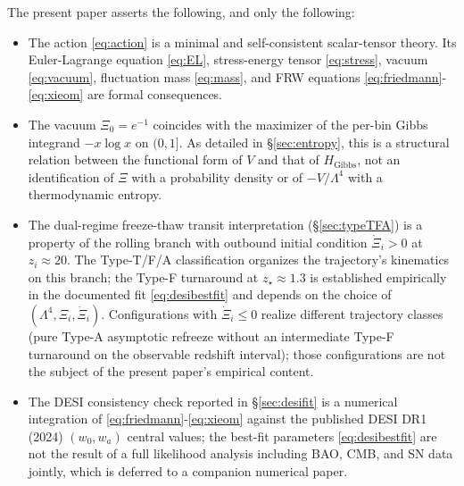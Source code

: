 \documentclass[11pt,reqno]{amsart}
\theoremstyle{plain}
\theoremstyle{definition}
\theoremstyle{remark}
\newcommand{\Gibbs}{\mathrm{Gibbs}}
\begin{document}
The present paper asserts the following, and only the following:
\begin{itemize}
  \item The action \eqref{eq:action} is a minimal and self-consistent
        scalar-tensor theory. Its Euler-Lagrange equation \eqref{eq:EL},
        stress-energy tensor \eqref{eq:stress}, vacuum \eqref{eq:vacuum},
        fluctuation mass \eqref{eq:mass}, and FRW equations
        \eqref{eq:friedmann}-\eqref{eq:xieom} are formal consequences.
  \item The vacuum $\Xi_0 = e^{-1}$ coincides with the maximizer of the
        per-bin Gibbs integrand $-x\log x$ on $(0,1]$. As detailed in
        \S\ref{sec:entropy}, this is a structural relation between
        the functional form of $V$ and that of $H_{\Gibbs}$, not an
        identification of $\Xi$ with a probability density or of
        $-V/\Lambda^{4}$ with a thermodynamic entropy.
  \item The dual-regime freeze-thaw transit interpretation
        (\S\ref{sec:typeTFA}) is a property of the rolling branch with
        outbound initial condition $\dot\Xi_i > 0$ at $z_i \approx 20$.
        The Type-T/F/A classification organizes the trajectory's
        kinematics on this branch; the Type-F turnaround at
        $z_\star \approx 1.3$ is established empirically in the
        documented fit \eqref{eq:desibestfit} and depends on the
        choice of $(\Lambda^4, \Xi_i, \dot\Xi_i)$. Configurations with
        $\dot\Xi_i \leq 0$ realize different trajectory classes (pure
        Type-A asymptotic refreeze without an intermediate Type-F
        turnaround on the observable redshift interval); those
        configurations are not the subject of the present paper's
        empirical content.
  \item The DESI consistency check reported in \S\ref{sec:desifit} is a
        numerical integration of \eqref{eq:friedmann}-\eqref{eq:xieom}
        against the published DESI DR1 (2024) $(w_0, w_a)$ central
        values; the best-fit parameters \eqref{eq:desibestfit} are not
        the result of a full likelihood analysis including BAO, CMB,
        and SN data jointly, which is deferred to a companion numerical
        paper.
\end{itemize}
\end{document}
